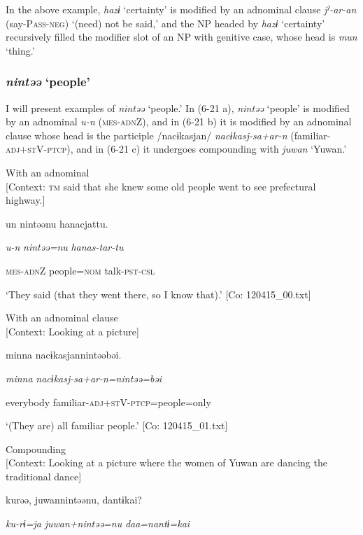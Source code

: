 In the above example, \textit{hazɨ} ‘certainty’ is modified by an adnominal clause \textit{jˀ-ar-an} (say-P\textsc{ass}-\textsc{neg}) ‘(need) not be said,’ and the NP headed by \textit{hazɨ} ‘certainty’ recursively filled the modifier slot of an NP with genitive case, whose head is \textit{mun} ‘thing.’

\subsubsection{\textit{nintəə} ‘people’}

I will present examples of \textit{nintəə} ‘people.’ In (6-21 a), \textit{nintəə} ‘people’ is modified by an adnominal \textit{u-n} (\textsc{mes}-\textsc{adn}Z), and in (6-21 b) it is modified by an adnominal clause whose head is the participle /nacɨkasjan/ \textit{nacɨkasj-sa+ar-n} (familiar-\textsc{adj}+\textsc{st}V-\textsc{ptcp}), and in (6-21 c) it undergoes compounding with \textit{juwan} ‘Yuwan.’

\ea\label{ex:6-21}
\ea With an adnominal\\{}
[Context: \textsc{tm} said that she knew some old people went to see prefectural highway.]

{\TM}
\gll un  nintəənu  hanacjattu.

      \textit{u-n}  \textit{nintəə=nu}  \textit{hanas-tar-tu}

      \textsc{mes}-\textsc{adn}Z  people=\textsc{nom}  talk-\textsc{pst}-\textsc{csl}

\glt ‘They said (that they went there, so I know that).’ [Co: 120415\_00.txt]
\z

 \ex With an adnominal clause\\{}
[Context: Looking at a picture]

{\TM}
\gll minna  nacɨkasjannintəəbəi.

      \textit{minna}  \textit{nacɨkasj-sa+ar-n=nintəə=bəi}

      everybody  familiar-\textsc{adj}+\textsc{st}V-\textsc{ptcp}=people=only

\glt ‘(They are) all familiar people.’ [Co: 120415\_01.txt]
\z

 \ex Compounding\\{}
[Context: Looking at a picture where the women of Yuwan are dancing the traditional dance]

{\TM}
\gll kurəə,  juwannintəənu,  dantɨkai?

      \textit{ku-rɨ=ja}  \textit{juwan+nintəə=nu}  \textit{daa=nantɨ=kai}

